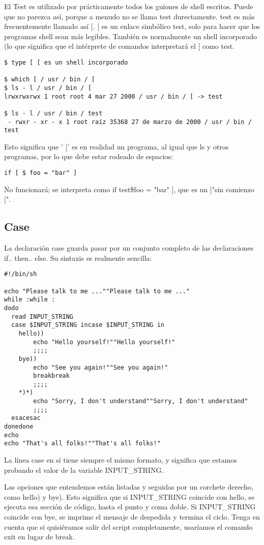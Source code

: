 \documentclass[12pt]{article}
\begin{document}
El Test es utilizado por prácticamente todos los guiones de shell escritos. Puede que no parezca así, porque a menudo no se llama test durectamente. test es más frecuentemente llamado así [. [ es un enlace simbólico test, solo para hacer que los programas shell sean más legibles. También es normalmente un shell incorporado (lo que significa que el intérprete de comandos interpretará el [ como test.

\begin{verbatim}
$ type [ [ es un shell incorporado

$ which [ / usr / bin / [
$ ls - l / usr / bin / [
lrwxrwxrwx 1 root root 4 mar 27 2000 / usr / bin / [ -> test

$ ls - l / usr / bin / test
 - rwxr - xr - x 1 root raíz 35368 27 de marzo de 2000 / usr / bin / test
\end{verbatim}

Esto significa que ' [' es en realidad un programa, al igual que ls y otros programas, por lo que debe estar rodeado de espacios:

\begin{verbatim}
if [ $ foo = "bar" ]
\end{verbatim}

No funcionará; se interpreta como if test\$foo = "bar" ], que es un ]"sin comienzo [".

\subsection{Case}

La declaración case guarda pasar por un conjunto completo de las declaraciones if.. then.. else. Su sintaxis es realmente sencilla:

\begin{verbatim}
#!/bin/sh

echo "Please talk to me ...""Please talk to me ..."
while :while :
dodo
  read INPUT_STRING
  case $INPUT_STRING incase $INPUT_STRING in
	hello))
		echo "Hello yourself!""Hello yourself!"
		;;;;
	bye))
		echo "See you again!""See you again!"
		breakbreak
		;;;;
	*)*)
		echo "Sorry, I don't understand""Sorry, I don't understand"
		;;;;
  esacesac
donedone
echo
echo "That's all folks!""That's all folks!"
\end{verbatim}

La línea case en sí tiene siempre el mismo formato, y significa que estamos probando el valor de la variable INPUT\_STRING.

Las opciones que entendemos están listadas y seguidas por un corchete derecho, como hello) y bye).
Esto significa que si INPUT\_STRING coincide con hello, se ejecuta esa sección de código, hasta el punto y coma doble.
Si INPUT\_STRING coincide con bye, se imprime el mensaje de despedida y termina el ciclo. Tenga en cuenta que si quisiéramos salir del script completamente, usaríamos el comando exit en lugar de break.
\end{document}
